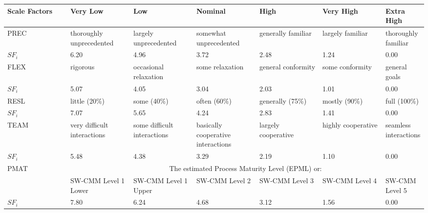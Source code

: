 \documentclass[10pt,a4paper,titlepage]{article}
\begin{document}
\noindent\hspace*{-50pt}\begin{tabular}{|p{0.15\linewidth}|p{0.15\linewidth}|p{0.15\linewidth}|p{0.15\linewidth}|p{0.15\linewidth}|p{0.15\linewidth}|p{0.15\linewidth}|}
\hline 
Scale Factors & Very Low & Low & Nominal & High & Very High  & Extra High \\ 
\hline 
PREC & thoroughly unprecedented & largely unprecedented & somewhat unprecedented & generally familiar & largely familiar & thoroughly familiar \\ 
$SF_i$ & 6.20 & 4.96 & 3.72 & 2.48 & 1.24 & 0.00 \\

\hline 
FLEX & rigorous & occasional relaxation & some relaxation & general conformity & some conformity & general goals \\ 
$SF_i$ & 5.07 & 4.05 & 3.04 & 2.03 & 1.01 & 0.00 \\ 

\hline 
RESL & little (20\%) & some (40\%) & often (60\%) & generally (75\%) & mostly (90\%) & full (100\%) \\ 
$SF_i$ & 7.07 & 5.65 & 4.24 & 2.83 & 1.41 & 0.00 \\

\hline 
TEAM & very difficult interactions & some difficult interactions & basically cooperative interactions & largely cooperative & highly cooperative & seamless interactions \\ 
$SF_i$ & 5.48 & 4.38 & 3.29 & 2.19 & 1.10 & 0.00 \\

\hline 
PMAT & \multicolumn{6}{|c|}{The estimated Process Maturity Level (EPML) or:}\\
\cline{2-7}
 & SW-CMM Level 1 Lower & SW-CMM Level 1 Upper & SW-CMM Level 2 & SW-CMM Level 3 & SW-CMM Level 4 & SW-CMM Level 5 \\
$SF_i$ & 7.80 & 6.24 & 4.68 & 3.12 & 1.56 & 0.00 \\
\hline 
\end{tabular}
\end{document}
